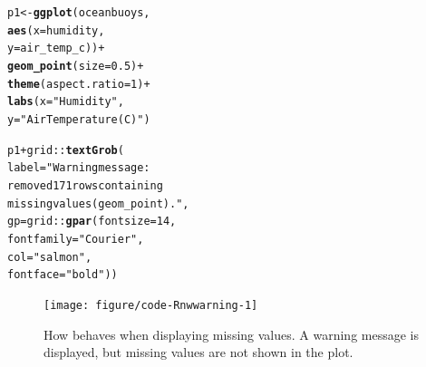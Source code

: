 \documentclass{article}\usepackage[]{graphicx}\usepackage[]{xcolor}
\makeatletter
\newcommand{\hlnum}[1]{\textcolor[rgb]{0.686,0.059,0.569}{#1}}%
\newcommand{\hlstr}[1]{\textcolor[rgb]{0.192,0.494,0.8}{#1}}%
\newcommand{\hlopt}[1]{\textcolor[rgb]{0,0,0}{#1}}%
\newcommand{\hlstd}[1]{\textcolor[rgb]{0.345,0.345,0.345}{#1}}%
\newcommand{\hlkwb}[1]{\textcolor[rgb]{0.69,0.353,0.396}{#1}}%
\newcommand{\hlkwc}[1]{\textcolor[rgb]{0.333,0.667,0.333}{#1}}%
\newcommand{\hlkwd}[1]{\textcolor[rgb]{0.737,0.353,0.396}{\textbf{#1}}}%
\newenvironment{kframe}{%
 \def\at@end@of@kframe{}%
 \ifinner\ifhmode%
  \def\at@end@of@kframe{\end{minipage}}%
  \begin{minipage}{\columnwidth}%
 \fi\fi%
 \def\FrameCommand##1{\hskip\@totalleftmargin \hskip-\fboxsep
 \colorbox{shadecolor}{##1}\hskip-\fboxsep
     \hskip-\linewidth \hskip-\@totalleftmargin \hskip\columnwidth}%
 \MakeFramed {\advance\hsize-\width
   \@totalleftmargin\z@ \linewidth\hsize
   \@setminipage}}%
 {\par\unskip\endMakeFramed%
 \at@end@of@kframe}
\newenvironment{knitrout}{}{} %
\makeatother
\begin{document}
\begin{knitrout}
\color{fgcolor}\begin{kframe}
\begin{alltt}
\hlstd{p1} \hlkwb{<-} \hlkwd{ggplot}\hlstd{(oceanbuoys,}
       \hlkwd{aes}\hlstd{(}\hlkwc{x} \hlstd{= humidity,}
           \hlkwc{y} \hlstd{= air_temp_c))} \hlopt{+}
  \hlkwd{geom_point}\hlstd{(}\hlkwc{size} \hlstd{=} \hlnum{0.5}\hlstd{)} \hlopt{+}
  \hlkwd{theme}\hlstd{(}\hlkwc{aspect.ratio} \hlstd{=} \hlnum{1}\hlstd{)} \hlopt{+}
  \hlkwd{labs}\hlstd{(}\hlkwc{x} \hlstd{=} \hlstr{"Humidity"}\hlstd{,}
       \hlkwc{y} \hlstd{=} \hlstr{"Air Temperature (C)"}\hlstd{)}

\hlstd{p1} \hlopt{+} \hlstd{grid}\hlopt{::}\hlkwd{textGrob}\hlstd{(}
  \hlkwc{label} \hlstd{=} \hlstr{"Warning message:
removed 171 rows containing 
missing values (geom_point)."}\hlstd{,}
\hlkwc{gp} \hlstd{= grid}\hlopt{::}\hlkwd{gpar}\hlstd{(}\hlkwc{fontsize} \hlstd{=} \hlnum{14}\hlstd{,}
                \hlkwc{fontfamily} \hlstd{=} \hlstr{"Courier"}\hlstd{,}
                \hlkwc{col} \hlstd{=} \hlstr{"salmon"}\hlstd{,}
                \hlkwc{fontface} \hlstd{=} \hlstr{"bold"}\hlstd{))}
\end{alltt}
\end{kframe}\begin{figure}

{\centering \texttt{[image: figure/code-Rnwwarning-1]} 

}

\caption[How  behaves when displaying missing values]{How  behaves when displaying missing values. A warning message is displayed, but missing values are not shown in the plot.}\label{fig:warning}
\end{figure}

\end{knitrout}
\end{document}

